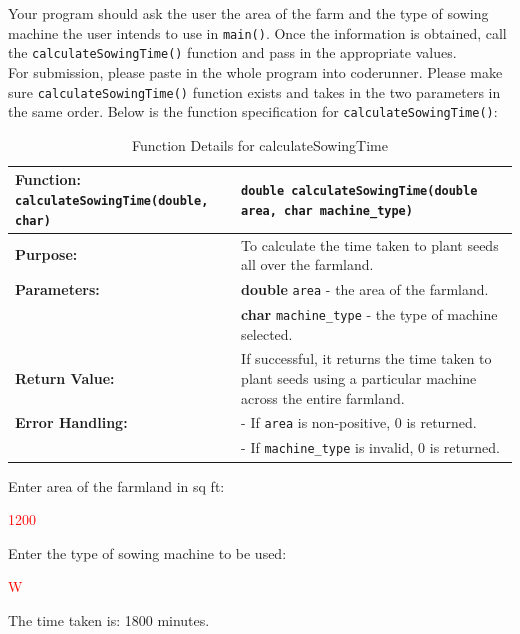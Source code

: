 Your program should ask the user the area of the farm and the type of sowing machine the user intends to use in \texttt{main()}. Once the information is obtained, call the \texttt{calculateSowingTime()} function and pass in the appropriate values. \\

For submission, please paste in the whole program into coderunner. Please make sure \texttt{calculateSowingTime()} function exists and takes in the two parameters in the same order. Below is the function specification for \texttt{calculateSowingTime()}:

\begin{table}[h!]
\centering
\begin{tabular}{|p{1.7in}|p{4.3in}|}
\hline
\textbf{Function:}  \texttt{calculateSowingTime(double, char)} 
& \texttt{double calculateSowingTime(double area, char machine\_type)} \\ \hline

\textbf{Purpose:} & To calculate the time taken to plant seeds all over the farmland. \\ \hline

\textbf{Parameters:} & 
\textbf{double} \texttt{area} - the area of the farmland. \\
 & \textbf{char} \texttt{machine\_type} - the type of machine selected. \\ \hline

\textbf{Return Value:} & 
If successful, it returns the time taken to plant seeds using a particular machine across the entire farmland. \\ \hline

\textbf{Error Handling:} & 
- If \texttt{area} is non-positive, 0 is returned. \\

& - If \texttt{machine\_type} is invalid, 0 is returned. \\ \hline


\end{tabular}
\caption{Function Details for calculateSowingTime}
\end{table}

\begin{sample}
Enter area of the farmland in sq ft:

 \textcolor{red}{1200}
 
Enter the type of sowing machine to be used:

 \textcolor{red}{W}
 
The time taken is: 1800 minutes.

\end{sample}

